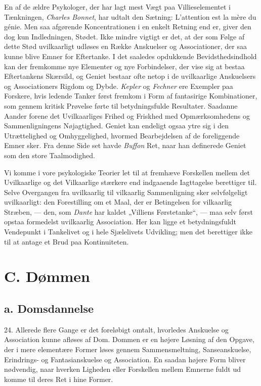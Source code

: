 \documentclass[12pt,a4paper]{book}
\newcommand{\opage}[1]{\marginnote{\footnotesize\textit{[#1]}}}
\newcommand{\apage}[1]{\marginnote{\footnotesize\textit{[#1]}}}
\begin{document}
En af de ældre Psykologer, der har lagt mest Vægt paa Villieselementet i
Tænkningen, \emph{Charles Bonnet}, har \apage{70} udtalt den Sætning: L'attention
est la mère du génie. Men saa afgørende Koncentrationen i en enkelt
Retning end er, giver den dog kun Indledningen, Stødet. Ikke mindre
vigtigt er det, at der som Følge af dette Stød uvilkaarligt udløses en
Række Anskuelser og Associationer, der saa kunne blive Emner for
Eftertanke. I det saaledes opdukkende Bevidsthedsindhold kan der
fremkomme nye Elementer og nye Forbindelser, der vise sig at bestaa
Eftertankens Skærsild, og Geniet bestaar ofte netop i de uvilkaarlige
Anskuelsers og Associationers Rigdom og Dybde. \emph{Kepler} og
\emph{Fechner} ere Exempler paa Forskere, hvis ledende Tanker først
fremkom i Form af fantasirige Kombinationer, som gennem kritisk Prøvelse
førte til betydningsfulde Resultater. Saadanne Aander forene det
Uvilkaarliges Frihed og Friskhed med Opmærksomhedens og
Sammenligningens Nøjagtighed. Geniet kan endeligt ogsaa ytre sig i den
Utrættelighed og Omhyggelighed, hvormed Bearbejdelsen af de foreliggende
Emner sker. Fra denne Side set havde \emph{Buffon} Ret, naar han
definerede Geniet som den store Taalmodighed.

Vi komme i vore psykologiske Teorier let til at fremhæve Forskellen
mellem det Uvilkaarlige og det Vilkaarlige stærkere end indgaaende
Iagttagelse berettiger til. Selve Overgangen fra uvilkaarlig til
vilkaarlig Sammenligning sker selvfølgeligt uvilkaarligt: den
Forestilling om et Maal, der er Betingelsen for vilkaarlig Stræben, ---
den, som \emph{Dante} har kaldet „Villiens Førstetanke“, --- maa selv
først opstaa formedelst uvilkaarlig Association. Her kan ligge et
betydningsfuldt Vendepunkt i Tankelivet og i hele Sjælelivets Udvikling;
men det berettiger ikke til at antage et Brud paa Kontinuiteten.

\opage{71} \section*{C. Dømmen}
\label{sec:dommen}

\subsection*{a. Domsdannelse}
\label{ssec:domsdannelse}

24. Allerede flere Gange er det foreløbigt omtalt, hvorledes Anskuelse
og Association kunne afløses af Dom. Dommen er en højere Løsning af den
Opgave, der i mere elementære Former løses gennem Sammensmeltning,
Sanseanskuelse, Erindrings- og Fantasianskuelse og Association. En
saadan højere Form bliver nødvendig, naar hverken Ligheden eller
Forskellen mellem Emnerne fuldt ud komme til deres Ret i hine Former.
\end{document}
